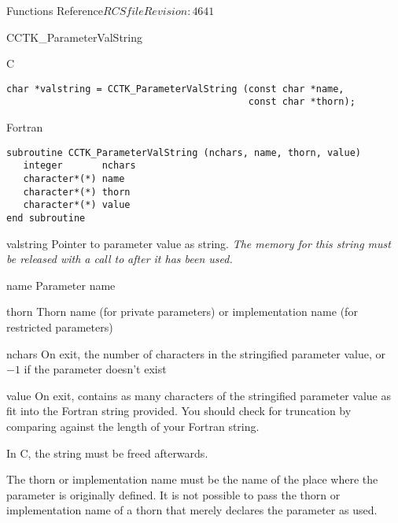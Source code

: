 \begin{cactuspart}{ Functions Reference}{$RCSfile$}{$Revision: 4641 $}
\begin{FunctionDescription}{CCTK\_ParameterValString}
\begin{SynopsisSection}
\begin{Synopsis}{C}
\begin{verbatim}
char *valstring = CCTK_ParameterValString (const char *name,
                                           const char *thorn);
\end{verbatim}
\end{Synopsis}
\begin{Synopsis}{Fortran}
\begin{verbatim}
subroutine CCTK_ParameterValString (nchars, name, thorn, value)
   integer       nchars
   character*(*) name
   character*(*) thorn
   character*(*) value
end subroutine
\end{verbatim}
\end{Synopsis}
\end{SynopsisSection}

\begin{ResultSection}
\begin{Result}{valstring}
Pointer to parameter value as string.  \emph{The memory for this string
must be released with a call to}  \emph{after it has been used.}
\end{Result}
\end{ResultSection}

\begin{ParameterSection}
\begin{Parameter}{name}
Parameter name
\end{Parameter}
\begin{Parameter}{thorn}
Thorn name (for private parameters) or implementation name (for
restricted parameters)
\end{Parameter}
\begin{Parameter}{nchars}
On exit, the number of characters in the stringified parameter value,
or $-1$ if the parameter doesn't exist
\end{Parameter}
\begin{Parameter}{value}
On exit, contains as many characters of the stringified parameter value as
fit into the Fortran string provided.
You should check for truncation by comparing  against the length
of your Fortran string.
\end{Parameter}
\end{ParameterSection}

\begin{Discussion}
In C, the string  must be freed afterwards.

The thorn or implementation name must be the name of the place where
the parameter is originally defined.  It is not possible to pass the
thorn or implementation name of a thorn that merely declares the
parameter as used.


\end{Discussion}
\end{FunctionDescription}
\end{cactuspart}
